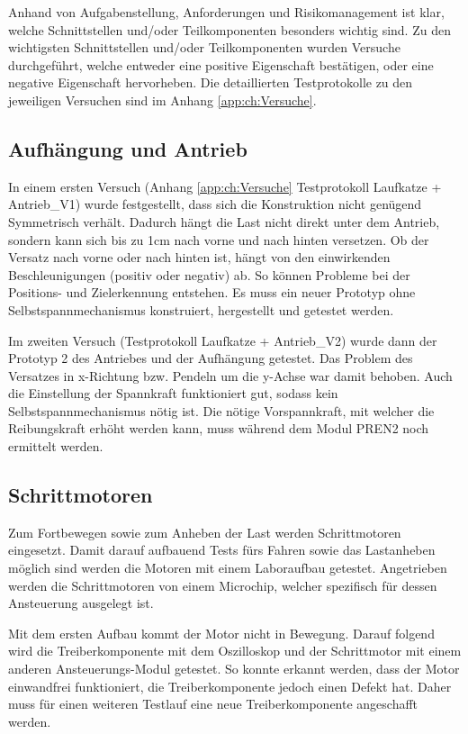 \documentclass[a4paper]{report}
\begin{document}
Anhand von Aufgabenstellung, Anforderungen und Risikomanagement ist klar, welche Schnittstellen und/oder Teilkomponenten besonders wichtig sind. Zu den wichtigsten Schnittstellen und/oder Teilkomponenten wurden Versuche durchgeführt, welche entweder eine positive Eigenschaft bestätigen, oder eine negative Eigenschaft hervorheben. Die detaillierten Testprotokolle zu den jeweiligen Versuchen sind im Anhang \ref{app:ch:Versuche}.

\subsection{Aufhängung und Antrieb}
In einem ersten Versuch (Anhang \ref{app:ch:Versuche} Testprotokoll Laufkatze + Antrieb\_V1) wurde festgestellt, dass sich die Konstruktion nicht genügend Symmetrisch verhält. Dadurch hängt die Last nicht direkt unter dem Antrieb, sondern kann sich bis zu 1cm nach vorne und nach hinten versetzen. Ob der Versatz nach vorne oder nach hinten ist, hängt von den einwirkenden Beschleunigungen (positiv oder negativ) ab. So können Probleme bei der Positions- und Zielerkennung entstehen. Es muss ein neuer Prototyp ohne Selbstspannmechanismus konstruiert, hergestellt und getestet werden.

Im zweiten Versuch (Testprotokoll Laufkatze + Antrieb\_V2) wurde dann der Prototyp 2 des Antriebes und der Aufhängung getestet. Das Problem des Versatzes in x-Richtung bzw. Pendeln um die y-Achse war damit behoben. Auch die Einstellung der Spannkraft funktioniert gut, sodass kein Selbstspannmechanismus nötig ist. Die nötige Vorspannkraft, mit welcher die Reibungskraft erhöht werden kann, muss während dem Modul PREN2 noch ermittelt werden.

\subsection{Schrittmotoren}
Zum Fortbewegen sowie zum Anheben der Last werden Schrittmotoren eingesetzt. Damit darauf aufbauend Tests fürs Fahren sowie das Lastanheben möglich sind werden die Motoren mit einem Laboraufbau getestet. Angetrieben werden die Schrittmotoren von einem Microchip, welcher spezifisch für dessen Ansteuerung ausgelegt ist.

Mit dem ersten Aufbau kommt der Motor nicht in Bewegung. Darauf folgend wird die Treiberkomponente mit dem Oszilloskop und der Schrittmotor mit einem anderen Ansteuerungs-Modul getestet. So konnte erkannt werden, dass der Motor einwandfrei funktioniert, die Treiberkomponente jedoch einen Defekt hat. Daher muss für einen weiteren Testlauf eine neue Treiberkomponente angeschafft werden.
\end{document}
